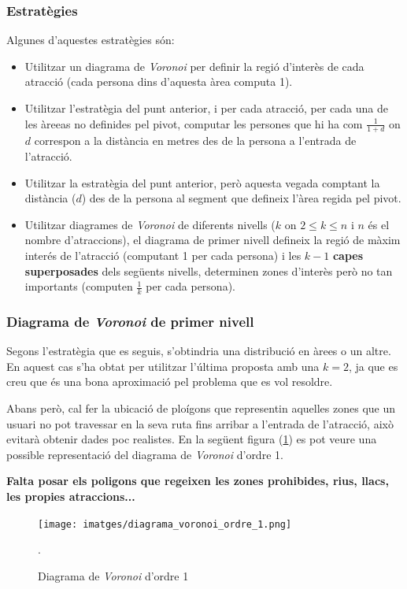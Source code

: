 \documentclass[12pt]{article}
\begin{document}
\subsubsection{Estratègies}
Algunes d'aquestes estratègies són:
\begin{itemize}
	\item Utilitzar un diagrama de \textit{Voronoi} per definir la regió d'interès de cada atracció (cada persona dins d'aquesta àrea computa 1).
	\item Utilitzar l'estratègia del punt anterior, i per cada atracció, per cada una de les àreeas no definides pel pivot, computar les persones que hi ha com $\frac{1}{1+d}$ on $d$ correspon a la distància en metres des de la persona a l'entrada de l'atracció.
	\item Utilitzar la estratègia del punt anterior, però aquesta vegada comptant la distància ($d$) des de la persona al segment que defineix l'àrea regida pel pivot.
	\item Utilitzar diagrames de \textit{Voronoi} de diferents nivells ($k$ on $2 \le k \le n$ i $n$ és el nombre d'atraccions), el diagrama de primer nivell defineix la regió de màxim interés de l'atracció (computant 1 per cada persona) i les $k-1$ \textbf{capes superposades} dels següents nivells, determinen zones d'interès però no tan importants (computen $\frac{1}{k}$ per cada persona).
\end{itemize}

\subsubsection{Diagrama de \textit{Voronoi} de primer nivell}
Segons l'estratègia que es seguis, s'obtindria una distribució en àrees o un altre. En aquest cas s'ha obtat per utilitzar l'última proposta amb una $k = 2$, ja que es creu que és una bona aproximació pel problema que es vol resoldre. 

Abans però, cal fer la ubicació de ploígons que representin aquelles zones que un usuari no pot travessar en la seva ruta fins arribar a l'entrada de l'atracció, això evitarà obtenir dades poc realistes. En la següent figura (\ref{fig:diagrama_voronoi_ordre_1}) es pot veure una possible representació del diagrama de \textit{Voronoi} d'ordre 1.

\textbf{Falta posar els poligons que regeixen les zones prohibides, rius, llacs, les propies atraccions...}

\begin{figure}[H]
	\centering
	\texttt{[image: imatges/diagrama\_voronoi\_ordre\_1.png]}\par\vspace{1cm}
	\caption{Diagrama de \textit{Voronoi} d'ordre 1}.
	\label{fig:diagrama_voronoi_ordre_1}
\end{figure}
\end{document}
